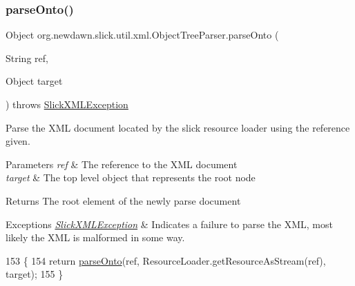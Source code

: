 \subsubsection{\texorpdfstring{parse\+Onto()}{parseOnto()}\hspace{0.1cm}{\footnotesize\ttfamily [1/2]}}
{\footnotesize\ttfamily Object org.\+newdawn.\+slick.\+util.\+xml.\+Object\+Tree\+Parser.\+parse\+Onto (\begin{DoxyParamCaption}\item[{String}]{ref,  }\item[{Object}]{target }\end{DoxyParamCaption}) throws \mbox{\hyperlink{classorg_1_1newdawn_1_1slick_1_1util_1_1xml_1_1_slick_x_m_l_exception}{Slick\+X\+M\+L\+Exception}}\hspace{0.3cm}{\ttfamily [inline]}}

Parse the X\+ML document located by the slick resource loader using the reference given.


\begin{DoxyParams}{Parameters}
{\em ref} & The reference to the X\+ML document \\
\hline
{\em target} & The top level object that represents the root node \\
\hline
\end{DoxyParams}
\begin{DoxyReturn}{Returns}
The root element of the newly parse document 
\end{DoxyReturn}

\begin{DoxyExceptions}{Exceptions}
{\em \mbox{\hyperlink{classorg_1_1newdawn_1_1slick_1_1util_1_1xml_1_1_slick_x_m_l_exception}{Slick\+X\+M\+L\+Exception}}} & Indicates a failure to parse the X\+ML, most likely the X\+ML is malformed in some way. \\
\hline
\end{DoxyExceptions}

\begin{DoxyCode}
153                                                                                 \{
154         \textcolor{keywordflow}{return} \mbox{\hyperlink{classorg_1_1newdawn_1_1slick_1_1util_1_1xml_1_1_object_tree_parser_ae2b6f03bcd08a6968a300f58e0b24f2e}{parseOnto}}(ref, ResourceLoader.getResourceAsStream(ref), target);
155     \}
\end{DoxyCode}
\mbox{\label{classorg_1_1newdawn_1_1slick_1_1util_1_1xml_1_1_object_tree_parser_a2196c40ecd24a4cc73b3471bcc44a682}} 
